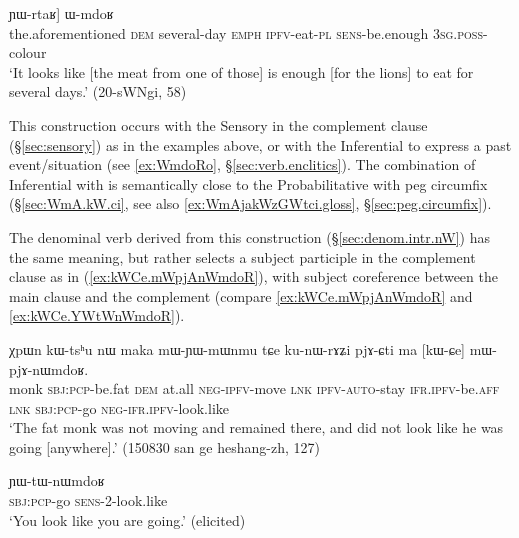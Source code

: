 \begin{exe}
	\ex \label{ex:YWrtaR.WmdoR}
	\gll    [iɕqʰa nɯ [kɤntɕʰɯ-sŋi ʑo tu-ndza-nɯ] ɲɯ-rtaʁ] ɯ-mdoʁ  \\
	the.aforementioned \textsc{dem} several-day \textsc{emph} \textsc{ipfv}-eat-\textsc{pl} \textsc{sens}-be.enough \textsc{3sg}.\textsc{poss}-colour \\
	\glt `It looks like [the meat from one of those] is enough [for the lions] to eat for several days.' (20-sWNgi, 58)
\end{exe}

This construction occurs with the Sensory in the complement clause (§\ref{sec:sensory}) as in the examples above, or with the Inferential to express a past event/situation (see \ref{ex:WmdoRo}, §\ref{sec:verb.enclitics}). The combination of Inferential with  is semantically close to the Probabilitative with peg circumfix (§\ref{sec:WmA.kW.ci}, see also \ref{ex:WmAjakWzGWtci.gloss}, §\ref{sec:peg.circumfix}).

The denominal verb   derived from this construction (§\ref{sec:denom.intr.nW}) has the same meaning, but rather selects a subject participle in the complement clause as in (\ref{ex:kWCe.mWpjAnWmdoR}), with subject coreference between the main clause and the complement (compare \ref{ex:kWCe.mWpjAnWmdoR} and \ref{ex:kWCe.YWtWnWmdoR}).


\begin{exe}
	\ex \label{ex:kWCe.mWpjAnWmdoR}
	\gll  χpɯn kɯ-tsʰu nɯ maka mɯ-ɲɯ-mɯnmu tɕe ku-nɯ-rɤʑi pjɤ-ɕti ma [kɯ-ɕe] mɯ-pjɤ-nɯmdoʁ. \\
	monk \textsc{sbj}:\textsc{pcp}-be.fat \textsc{dem} at.all \textsc{neg}-\textsc{ipfv}-move \textsc{lnk} \textsc{ipfv}-\textsc{auto}-stay \textsc{ifr}.\textsc{ipfv}-be.\textsc{aff} \textsc{lnk} \textsc{sbj}:\textsc{pcp}-go \textsc{neg}-\textsc{ifr}.\textsc{ipfv}-look.like \\
	\glt `The fat monk was not moving and remained there, and did not look like he was going [anywhere].'  (150830 san ge heshang-zh, 127)
\end{exe}

\begin{exe}
	\ex \label{ex:kWCe.YWtWnWmdoR}
	\gll [kɯ-ɕe] ɲɯ-tɯ-nɯmdoʁ \\
	\textsc{sbj}:\textsc{pcp}-go \textsc{sens}-2-look.like \\
	\glt `You look like you are going.' (elicited)
\end{exe}  

